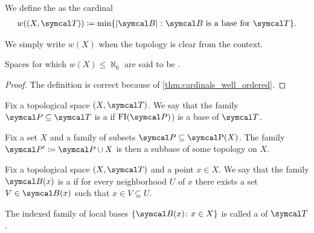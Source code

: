 \begin{definition}\label{def:topological_space_weight}
  We define the  as the cardinal
  \begin{align*}
    w((X, \Cal{T})) \coloneqq \min \{ \Abs{\Cal{B}} \colon \Cal{B} \text{ is a base for } \Cal{T} \}.
  \end{align*}

  We simply write \( w(X) \) when the topology is clear from the context.

  Spaces for which \( w(X) \leq \aleph_0 \) are said to be .
\end{definition}
\begin{proof}
  The definition is correct because of \cref{thm:cardinals_well_ordered}.
\end{proof}

\begin{definition}\label{def:topological_subbase}\cite[12]{Engelking1989}
  Fix a topological space \( (X, \Cal{T}) \). We say that the family \( \Cal{P} \subseteq \Cal{T} \) is a  if \( \FI(\Cal{P}) \)) is a base of \( \Cal{T} \).
\end{definition}

\begin{proposition}
  Fix a set \( X \) and a family of subsets \( \Cal{P} \subseteq \Power(X) \). The family \( \Cal{P}' \coloneqq \Cal{P} \cup X \) is then a subbase of some topology on \( X \).
\end{proposition}

\begin{definition}\label{def:topological_local_base}\cite[12]{Engelking1989}
  Fix a topological space \( (X, \Cal{T}) \) and a point \( x \in X \). We say that the family \( \Cal{B}(x) \) is a  if for every neighborhood \( U \) of \( x \) there exists a set \( V \in \Cal{B}(x) \) such that \( x \in V \subseteq U \).

  The indexed family of local bases \( \{ \Cal{B}(x) \colon x \in X \} \) is called a  of \( \Cal{T} \).
\end{definition}

